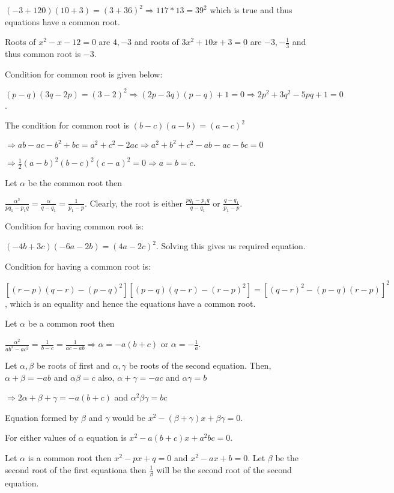   $(-3 + 120)(10 + 3) = (3 + 36)^2\Rightarrow 117 * 13 = 39^2$ which is true and thus equations have a
  common root.

  Roots of $x^2 - x - 12 = 0$ are $4, -3$ and roots of $3x^2 + 10x + 3 = 0$ are $-3, -\frac{1}{3}$ and thus
  common root is $-3$.
\item Condition for common root is given below:

  $(p - q)(3q - 2p) = (3 - 2)^2\Rightarrow (2p - 3q)(p - q) + 1 = 0\Rightarrow 2p^2 + 3q^2 - 5pq + 1 = 0$.
\item The condition for common root is $(b - c)(a - b) =  (a - c)^2$

  $\Rightarrow ab - ac - b^2 + bc = a^2 + c^2 - 2ac\Rightarrow a^2 + b^2 + c^2 - ab - ac - bc = 0$

  $\Rightarrow \frac{1}{2}(a - b)^2(b - c)^2(c - a)^2 = 0\Rightarrow a = b = c$.
\item Let $\alpha$ be the common root then

  $\frac{\alpha^2}{pq_1 - p_1q} = \frac{\alpha}{q - q_1} = \frac{1}{p_1 - p}$. Clearly, the root is either
  $\frac{pq_1 - p_1q}{q - q_1}$ or $\frac{q - q_1}{p_1 - p}$.
\item Condition for having common root is:

  $(-4b + 3c)(-6a - 2b) = (4a - 2c)^2$. Solving this gives us required equation.
\item Condition for having a common root is:

  $[(r - p)(q - r) - (p - q)^2][(p - q)(q - r) - (r - p)^2] = [(q - r)^2 - (p - q)(r - p)]^2$, which is an
  equality and hence the equations have a common root.
\item Let $\alpha$ be a common root then

  $\frac{\alpha^2}{ab^2 - ac^2} = \frac{1}{b - c} = \frac{1}{ac - ab}\Rightarrow \alpha = -a(b + c)$ or
  $\alpha = -\frac{1}{a}$.

  Let $\alpha, \beta$ be roots of first and $\alpha, \gamma$ be roots of the second equation. Then,
  $\alpha + \beta = -ab$ and $\alpha\beta = c$ also, $\alpha + \gamma = -ac$ and
  $\alpha\gamma = b$

  $\Rightarrow 2\alpha + \beta + \gamma = -a(b + c)$ and $\alpha^2\beta\gamma = bc$

  Equation formed by $\beta$ and $\gamma$ would be $x^2 - (\beta + \gamma)x + \beta\gamma = 0$.

  For either values of $\alpha$ equation is $x^2 - a(b + c)x + a^2bc = 0$.
\item Let $\alpha$ is a common root then $x^2 - px + q = 0$ and $x^2 - ax + b = 0$. Let $\beta$ be the
  second root of the first equationa then $\frac{1}{\beta}$ will be the second root of the second equation.

